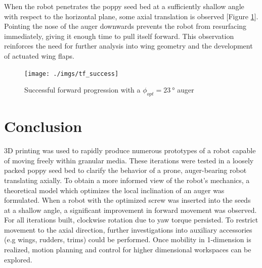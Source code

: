 \documentclass[letterpaper, 11 pt]{article}
\begin{document}
When the robot penetrates the poppy seed bed at a sufficiently shallow angle with respect to the horizontal plane, some axial translation is observed [Figure \ref{fig:tf_success}]. Pointing the nose of the auger downwards prevents the robot from resurfacing immediately, giving it enough time to pull itself forward. This observation reinforces the need for further analysis into wing geometry and the development of actuated wing flaps.   

\begin{figure}[H]
\centering
\texttt{[image: ./imgs/tf\_success]}
\caption{Successful forward progression with a $\phi_{opt} = \SI{23}{\degree}$ auger}
\label{fig:tf_success}
\end{figure}

\section{Conclusion}
3D printing was used to rapidly produce numerous prototypes of a robot capable of moving freely within granular media. These iterations were tested in a loosely packed poppy seed bed to clarify the behavior of a prone, auger-bearing robot translating axially. To obtain a more informed view of the robot's mechanics, a theoretical model  which optimizes the local inclination of an auger was formulated. When a robot with the optimized screw was inserted into the seeds at a shallow angle, a significant improvement in forward movement was observed. For all iterations built, clockwise rotation due to yaw torque persisted. To restrict movement to the axial direction, further investigations into auxiliary accessories (e.g wings, rudders, trims) could be performed. Once mobility in 1-dimension is realized, motion planning and control for higher dimensional workspaces can be explored.      



\end{document}
